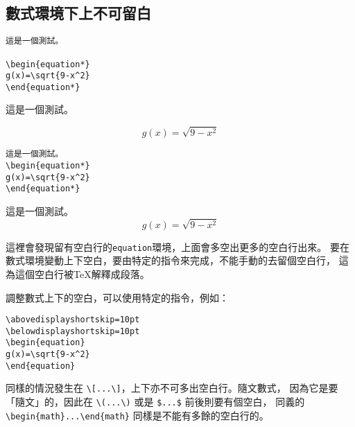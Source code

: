 \subsection{數式環境下上不可留白}

\begin{Wrong}
\begin{verbatim}
這是一個測試。

\begin{equation*}
g(x)=\sqrt{9-x^2}
\end{equation*}
\end{verbatim}
這是一個測試。

\begin{equation*}
g(x)=\sqrt{9-x^2}
\end{equation*}
\end{Wrong}

\begin{Right}
\begin{verbatim}
這是一個測試。
\begin{equation*}
g(x)=\sqrt{9-x^2}
\end{equation*}
\end{verbatim}
這是一個測試。
\begin{equation*}
g(x)=\sqrt{9-x^2}
\end{equation*}
\end{Right}

這裡會發現留有空白行的{\tt equation}環境，上面會多空出更多的空白行出來。
要在數式環境變動上下空白，要由特定的指令來完成，不能手動的去留個空白行，
這為這個空白行被\TeX 解釋成段落。

調整數式上下的空白，可以使用特定的指令，例如：

\begin{Code}
\begin{verbatim}
\abovedisplayshortskip=10pt
\belowdisplayshortskip=10pt
\begin{equation}
g(x)=\sqrt{9-x^2}
\end{equation}
\end{verbatim}
\end{Code}

同樣的情況發生在 \verb|\[...\]|，上下亦不可多出空白行。隨文數式，
因為它是要「隨文」的，因此在 \verb|\(...\)| 或是 \verb|$...$| 前後則要有個空白，
同義的 \verb|\begin{math}...\end{math}| 同樣是不能有多餘的空白行的。

\marginpar{\back}
